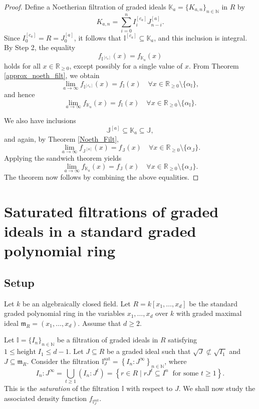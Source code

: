 \documentclass[12pt,a4paper]{amsart}
\theoremstyle{plain}
\theoremstyle{definition}
\numberwithin{equation}{theorem}
\newcommand{\mm}{\mathfrak{m}}
\begin{document}
\begin{proof}
 Define a Noetherian filtration of graded ideals $\mathbb{K}_a = \{K_{a,n}\}_{n\in\mathbb{N}}$ in $R$ by $$K_{a,n} = \sum_{i=0}^n I^{[c_a]}_i J^{[a]}_{n-i}.$$ Since $I^{[c_a]}_0 = R = J^{[a]}_0$, it follows that $\mathbb{I}^{[c_a]} \subseteq \mathbb{K}_a$, and this inclusion is integral. By Step 2, the equality $$f_{\mathbb{I}^{[c_a]}}(x) = f_{\mathbb{K}_a}(x)$$ holds for all $x\in\mathbb{R}_{\geq 0}$, except possibly for a single value of $x$. From Theorem \ref{approx_noeth_filt}, we obtain $$\lim_{a\to\infty} f_{\mathbb{I}^{[c_a]}}(x) = f_{\mathbb{I}}(x) \quad \forall x\in\mathbb{R}_{\geq 0}\setminus\{\alpha_{\mathbb{I}}\},$$ and hence $$\lim_{a\to\infty} f_{\mathbb{K}_a}(x) = f_{\mathbb{I}}(x) \quad \forall x\in\mathbb{R}_{\geq 0}\setminus\{\alpha_{\mathbb{I}}\}.$$

 We also have inclusions $$\mathbb{J}^{[a]} \subseteq \mathbb{K}_a \subseteq \mathbb{J},$$ and again, by Theorem \ref{Noeth_Filt}, $$\lim_{a\to\infty} f_{\mathbb{J}^{[a]}}(x) = f_{\mathbb{J}}(x) \quad \forall x\in\mathbb{R}_{\geq 0}\setminus\{\alpha_{\mathbb{J}}\}.$$ Applying the sandwich theorem yields $$\lim_{a\to\infty}f_{\mathbb{K}_a}(x) = f_{\mathbb{J}}(x) \quad \forall x\in\mathbb{R}_{\geq 0}\setminus\{\alpha_{\mathbb{J}}\}.$$ The theorem now follows by combining the above equalities.
\end{proof}

\section{Saturated filtrations of graded ideals in a standard graded polynomial ring}\label{section 6}

\subsection{Setup}\label{setup3}
Let $k$ be an algebraically closed field. Let $R = k[x_1, \ldots, x_d]$ be the standard graded polynomial ring in the variables $x_1, \ldots, x_d$ over $k$ with graded maximal ideal $\mm_R = (x_1, \ldots, x_d)$. Assume that $d\geq 2$.

Let $\mathbb{I}=\{I_n\}_{n\in\mathbb{N}}$ be a filtration of graded ideals in $R$ satisfying $1\leq \mathrm{height}\;I_1\leq d-1$. Let $J\subseteq R$ be a graded ideal such that $\sqrt{J} \not\subset \sqrt{I_1}$ and $J \subseteq \mathfrak{m}_R$. Consider the filtration $\mathbb{I}^{\mathrm{sat}}_J = \left\{I_n \colon J^{\infty}\right\}_{n\in\mathbb{N}}$, where $$I_n \colon J^{\infty} = \bigcup_{t\ge 1} \left(I_n \colon J^t\right) = \left\{r\in R \mid rJ^t \subseteq I^n\;\;\text{for some $t\ge 1$}\right\}.$$ This is the \emph{saturation} of the filtration $\mathbb{I}$ with respect to $J$. We shall now study the associated density function $f_{\mathbb{I}^{\mathrm{sat}}_J}$.
\end{document}
